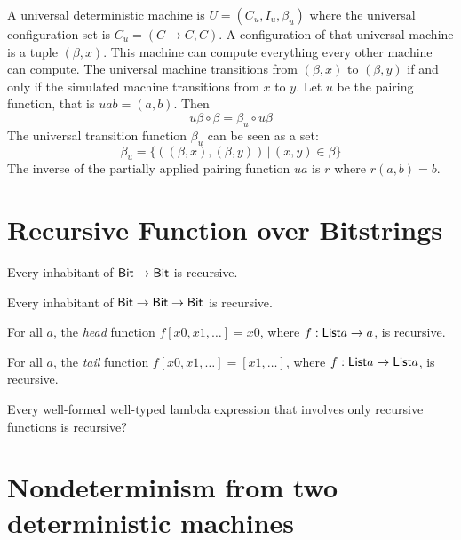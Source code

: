 A universal deterministic machine is $U = (C_u, I_u, \beta_u)$
where the universal configuration set is $C_u = (C \to C, C)$.
A configuration of that universal machine is a tuple $(\beta, x)$.
This machine can compute everything every other machine can compute.
The universal machine transitions from $(\beta, x)$ to $(\beta, y)$
if and only if the simulated machine transitions from $x$ to $y$.
Let $u$ be the pairing function, that is $uab = (a,b)$.
Then
\begin{equation}
    u \beta \circ \beta = \beta_u \circ u \beta
\end{equation}
The universal transition function $\beta_u$ can be seen as a set:
\begin{equation}
    \beta_u = \{ ((\beta,x), (\beta,y)) \,|\, (x,y) \in \beta \}
\end{equation}
The inverse of the partially applied pairing function $u a$ is $r$
where $r (a,b) = b$.

\section{Recursive Function over Bitstrings}

Every inhabitant of $\textsf{Bit} \to \textsf{Bit}$ is recursive.

Every inhabitant of $\textsf{Bit} \to \textsf{Bit} \to \textsf{Bit}$ is recursive.

For all $a$, the \emph{head} function $f [x 0, x 1, \ldots] = x 0$,
where $f : \textsf{List}{a} \to a$, is recursive.

For all $a$, the \emph{tail} function $f [x 0, x 1, \ldots] = [x 1, \ldots]$,
where $f : \textsf{List}{a} \to \textsf{List}{a}$, is recursive.

Every well-formed well-typed lambda expression
that involves only recursive functions is recursive?

\section{Nondeterminism from two deterministic machines}

